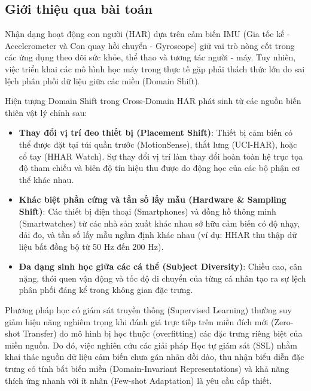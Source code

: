 \subsection{Giới thiệu qua bài toán}
Nhận dạng hoạt động con người (HAR) dựa trên cảm biến IMU (Gia tốc kế - Accelerometer và Con quay hồi chuyển - Gyroscope) giữ vai trò nòng cốt trong các ứng dụng theo dõi sức khỏe, thể thao và tương tác người - máy. Tuy nhiên, việc triển khai các mô hình học máy trong thực tế gặp phải thách thức lớn do sai lệch phân phối dữ liệu giữa các miền (Domain Shift).

Hiện tượng Domain Shift trong Cross-Domain HAR phát sinh từ các nguồn biến thiên vật lý chính sau:
\begin{itemize}
    \item \textbf{Thay đổi vị trí đeo thiết bị (Placement Shift)}: Thiết bị cảm biến có thể được đặt tại túi quần trước (MotionSense), thắt lưng (UCI-HAR), hoặc cổ tay (HHAR Watch). Sự thay đổi vị trí làm thay đổi hoàn toàn hệ trục tọa độ tham chiếu và biên độ tín hiệu thu được do động học của các bộ phận cơ thể khác nhau.
    \item \textbf{Khác biệt phần cứng và tần số lấy mẫu (Hardware \& Sampling Shift)}: Các thiết bị điện thoại (Smartphones) và đồng hồ thông minh (Smartwatches) từ các nhà sản xuất khác nhau sở hữu cảm biến có độ nhạy, dải đo, và tần số lấy mẫu ngầm định khác nhau (ví dụ: HHAR thu thập dữ liệu bất đồng bộ từ 50 Hz đến 200 Hz).
    \item \textbf{Đa dạng sinh học giữa các cá thể (Subject Diversity)}: Chiều cao, cân nặng, thói quen vận động và tốc độ di chuyển của từng cá nhân tạo ra sự lệch phân phối đáng kể trong không gian đặc trưng.
\end{itemize}

Phương pháp học có giám sát truyền thống (Supervised Learning) thường suy giảm hiệu năng nghiêm trọng khi đánh giá trực tiếp trên miền đích mới (Zero-shot Transfer) do mô hình bị học thuộc (overfitting) các đặc trưng riêng biệt của miền nguồn. Do đó, việc nghiên cứu các giải pháp Học tự giám sát (SSL) nhằm khai thác nguồn dữ liệu cảm biến chưa gán nhãn dồi dào, thu nhận biểu diễn đặc trưng có tính bất biến miền (Domain-Invariant Representations) và khả năng thích ứng nhanh với ít nhãn (Few-shot Adaptation) là yêu cầu cấp thiết.
